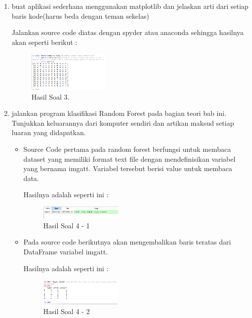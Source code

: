 \begin{enumerate}
	\item buat aplikasi sederhana menggunakan matplotlib dan jelaskan arti dari setiap baris kode(harus beda dengan teman sekelas)
	\hfill\break
	
	Jalankan source code diatas dengan spyder atau anaconda sehingga hasilnya akan seperti berikut : 

	\begin{figure}[H]
	\centering
		\includegraphics[width=4cm]{figures/1174096/tugas3/hasil2.PNG}
		\caption{Hasil Soal 3.}
	\end{figure}


	\item jalankan program klasifikasi Random Forest pada bagian teori bab ini. Tunjukkan keluarannya dari komputer sendiri dan artikan maksud setiap luaran yang didapatkan.
	\hfill\break
\begin{itemize}
	\item Source Code pertama pada random forest berfungsi untuk membaca dataset yang memiliki format text file dengan mendefinisikan variabel yang bernama imgatt. Variabel tersebut berisi value untuk membaca data. 
	
	Hasilnya adalah seperti ini :

	\begin{figure}[H]
	\centering
		\includegraphics[width=4cm]{figures/1174096/tugas3/hasil41.PNG}
		\caption{Hasil Soal 4 - 1}
	\end{figure}

	\item Pada source code berikutnya akan mengembalikan baris teratas dari DataFrame variabel imgatt.
	
	Hasilnya adalah seperti ini :

	\begin{figure}[H]
	\centering
		\includegraphics[width=4cm]{figures/1174096/tugas3/hasil42.PNG}
		\caption{Hasil Soal 4 - 2}
	\end{figure}


\end{itemize}
\end{enumerate}
